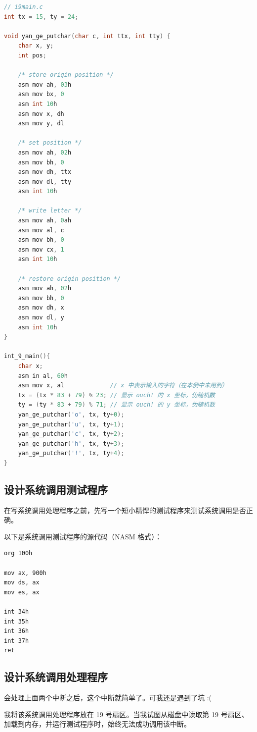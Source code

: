 \documentclass{article}
\begin{document}
\begin{lstlisting}[language=C]
// i9main.c
int tx = 15, ty = 24;

void yan_ge_putchar(char c, int ttx, int tty) {
	char x, y;
	int pos;
	
	/* store origin position */ 
	asm mov ah, 03h
	asm mov bx, 0
	asm int 10h
	asm mov x, dh
	asm mov y, dl
	
	/* set position */ 
	asm mov ah, 02h
	asm mov bh, 0
	asm mov dh, ttx
	asm mov dl, tty
	asm int 10h
	
	/* write letter */
	asm mov ah, 0ah
	asm mov al, c
	asm mov bh, 0
	asm mov cx, 1
	asm int 10h

	/* restore origin position */
	asm mov ah, 02h
	asm mov bh, 0
	asm mov dh, x
	asm mov dl, y
	asm int 10h
}

int_9_main(){
	char x;
	asm in al, 60h
	asm mov x, al             // x 中表示输入的字符（在本例中未用到）
	tx = (tx * 83 + 79) % 23; // 显示 ouch! 的 x 坐标，伪随机数
	ty = (ty * 83 + 79) % 71; // 显示 ouch! 的 y 坐标，伪随机数
	yan_ge_putchar('o', tx, ty+0);
	yan_ge_putchar('u', tx, ty+1);
	yan_ge_putchar('c', tx, ty+2);
	yan_ge_putchar('h', tx, ty+3);
	yan_ge_putchar('!', tx, ty+4);
}
\end{lstlisting}

\subsection{设计系统调用测试程序}

在写系统调用处理程序之前，先写一个短小精悍的测试程序来测试系统调用是否正确。

以下是系统调用测试程序的源代码（NASM 格式）：

\begin{lstlisting}[language={[x86masm]Assembler}]
org 100h

mov ax, 900h
mov ds, ax
mov es, ax

int 34h
int 35h
int 36h
int 37h
ret
\end{lstlisting}

\subsection{设计系统调用处理程序}

会处理上面两个中断之后，这个中断就简单了。可我还是遇到了坑 :(

我将该系统调用处理程序放在 19 号扇区。当我试图从磁盘中读取第 19 号扇区、加载到内存，并运行测试程序时，始终无法成功调用该中断。
\end{document}
